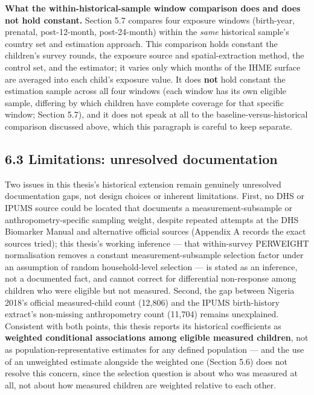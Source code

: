 \textbf{What the within-historical-sample window comparison does and does not hold constant.} Section 5.7 compares four exposure windows (birth-year, prenatal, post-12-month, post-24-month) within the \textit{same} historical sample's country set and estimation approach. This comparison holds constant the children's survey rounds, the exposure source and spatial-extraction method, the control set, and the estimator; it varies only which months of the IHME surface are averaged into each child's exposure value. It does \textbf{not} hold constant the estimation sample across all four windows (each window has its own eligible sample, differing by which children have complete coverage for that specific window; Section 5.7), and it does not speak at all to the baseline-versus-historical comparison discussed above, which this paragraph is careful to keep separate.

\subsection*{6.3 Limitations: unresolved documentation}

Two issues in this thesis's historical extension remain genuinely unresolved documentation gaps, not design choices or inherent limitations. First, no DHS or IPUMS source could be located that documents a measurement-subsample or anthropometry-specific sampling weight, despite repeated attempts at the DHS Biomarker Manual and alternative official sources (Appendix A records the exact sources tried); this thesis's working inference --- that within-survey PERWEIGHT normalisation removes a constant measurement-subsample selection factor under an assumption of random household-level selection --- is stated as an inference, not a documented fact, and cannot correct for differential non-response among children who were eligible but not measured. Second, the gap between Nigeria 2018's official measured-child count (12,806) and the IPUMS birth-history extract's non-missing anthropometry count (11,704) remains unexplained. Consistent with both points, this thesis reports its historical coefficients as \textbf{weighted conditional associations among eligible measured children}, not as population-representative estimates for any defined population --- and the use of an unweighted estimate alongside the weighted one (Section 5.6) does not resolve this concern, since the selection question is about who was measured at all, not about how measured children are weighted relative to each other.

